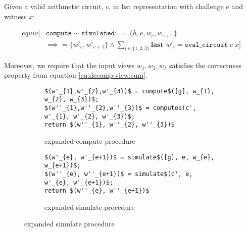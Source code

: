 \begin{lemma}
  \label{lem:zkboo:decomposition:privacy_aux}
  Given a valid arithmetic circuit, $c$, in list representation with challenge
  $e$ and witness $x$:

  \begin{align*}
    equiv[&\texttt{compute} \sim \texttt{simulated} : \; =\!\{h, e, w_{e}, w_{e+1}\} \\
           &\implies =\!\{w'_{e}, w'_{e+1}\} \land \sum_{i \in \{1,2,3\}} \textbf{last } w'_{i} = \texttt{eval\_{circuit}} \; c \; x]
  \end{align*}

  Moreover, we require that the input views $w_{1}, w_{2}, w_{3}$ satisfies the
  correctness property from equation \ref{eq:decomp:view:sum}.
\end{lemma}
  \begin{figure}
    \caption{expanded procedures}
    \label{lst:real/simulated}
    \centering
    \begin{subfigure}{0.48\textwidth }
    \begin{lstlisting}[mathescape]
$(w'_{1},w'_{2},w'_{3})$ = compute$([g], w_{1}, w_{2}, w_{3})$;
$(w''_{1},w''_{2},w''_{3})$ = compute$(c', w'_{1}, w'_{2}, w'_{3})$;
return $(w''_{1}, w''_{2}, w''_{3})$
    \end{lstlisting}
      \caption{expanded compute procedure}
    \end{subfigure}
    \hfill
    \begin{subfigure}{ 0.48\textwidth }
    \begin{lstlisting}[mathescape]
$(w'_{e}, w'_{e+1})$ = simulate$([g], e, w_{e}, w_{e+1})$;
$(w''_{e}, w''_{e+1})$ = simulate$(c', e, w'_{e}, w'_{e+1})$;
return $(w''_{e}, w''_{e+1})$
    \end{lstlisting}
      \caption{expanded simulate procedure}
    \end{subfigure}
  \end{figure}
